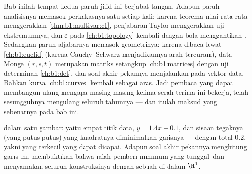 \begin{remark}
\label{rem:b1:multivar:perspectives}
Bab inilah tempat kedua paruh jilid ini berjabat tangan. Adapun
paruh analisisnya memasok perkakasnya satu  setiap kali:
karena teorema nilai rata-rata menggerakkan \cref{thm:b1:multivar:c1}, penjabaran
Taylor menggerakkan uji ekstremumnya, dan $\varepsilon$ pada
\cref{ch:b1:topology} kembali dengan bola menggantikan
. Sedangkan paruh aljabarnya memasok geometrinya: karena 
dibaca lewat  \cref{ch:b1:euclid}
(karena Cauchy--Schwarz menjadikannya arah tercuram), data Monge
$(r, s, t)$ merupakan matriks setangkup
\cref{ch:b1:matrices} dengan uji determinan
\cref{ch:b1:det}, dan soal akhir pekannya menjalankan  pada vektor data. Bahkan kurva
\cref{ch:b1:curves} kembali sebagai  aras. Jadi pembaca yang dapat
membangun ulang mengapa masing-masing kelima serah terima ini bekerja, telah
sesungguhnya mengulang seluruh tahunnya --- dan itulah maksud yang sebenarnya
pada bab  ini.
\end{remark}

\begin{omfigure}

{\small {} dalam satu gambar: yaitu empat titik data,
 $y = 1.4x - 0.1$, dan sisaan tegaknya
(yang putus-putus) yang kuadratnya diminimalkan garisnya --- dengan total $0.2$, yakni
yang terkecil yang dapat dicapai. Adapun soal akhir pekannya menghitung garis ini,
membuktikan bahwa ialah pemberi minimum yang tunggal, dan menyamakan seluruh
konstruksinya dengan sebuah  di dalam $\R^4$.}
\end{omfigure}

